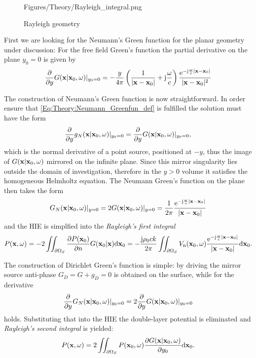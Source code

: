 \begin{figure}
	\centering
	\begin{overpic}[width = .5\columnwidth]{Figures/Theory/Rayleigh_integral.png}
	\end{overpic}
	\caption{Rayleigh geometry}
	\label{Fig:Theory:Rayleigh_geometry}
\end{figure}
\vspace{3mm}
First we are looking for the Neumann's Green function for the planar geometry under discussion:
For the free field Green's function the partial derivative on the plane $y_0 = 0$ is given by
\begin{equation}
\frac{\partial}{\partial y} G(\mathbf{x}|\mathbf{x}_0,\omega)|_{y_0 = 0} = 
- \frac{y}{4\pi}\left( \frac{1}{| \mathbf{x} - \mathbf{x}_0 |} + \mathrm{j} \frac{\omega}{c} \right) 
\frac{\mathrm{e}^{-\mathrm{j} \frac{\omega}{c}  | \mathbf{x} - \mathbf{x}_0 | }}{| \mathbf{x} - \mathbf{x}_0 |^2}
\end{equation}

The construction of Neumann's Green function is now straightforward. In order ensure that \eqref{Eq:Theory:Neumann_Greenfun_def} is fulfilled the solution must have the form
\begin{equation}
\frac{\partial}{\partial y} g_N(\mathbf{x}|\mathbf{x}_0,\omega)|_{y_0 = 0} = \frac{\partial}{\partial y} G(\mathbf{x}|\mathbf{x}_0,\omega)|_{y_0 = 0},
\end{equation}
which is the normal derivative of a point source, positioned at $-y$, thus the image of $G(\mathbf{x}|\mathbf{x}_0,\omega)$ mirrored on the infinite plane. Since this mirror singularity lies outside the domain of investigation, therefore in the $y > 0$ volume it satisfies the homogeneous Helmholtz equation. The Neumann Green's function on the plane then takes the form
\begin{equation}
G_N(\mathbf{x}|\mathbf{x}_0, \omega)|_{y = 0} = 
2G(\mathbf{x}|\mathbf{x}_0, \omega)|_{y = 0} = 
\frac{1}{2\pi} \frac{\mathrm{e}^{-\mathrm{j} \frac{\omega}{c} |\mathbf{x}-\mathbf{x}_0|}}{ |\mathbf{x}-\mathbf{x}_0| }
\end{equation}
and the HIE is simplfied into the \emph{Rayleigh's first integral}
\begin{multline}
P(\mathbf{x},\omega) =
- 2 \iint_{\partial \Omega_S} \frac{\partial P(\mathbf{x}_0)}{\partial n} G(\mathbf{x}_0|\mathbf{x}) \mathrm{d} \mathbf{x}_0 
=
 - \frac{\mathrm{j} \rho_0 c k}{2\pi} \iint_{\partial \Omega_S} V_{\mathrm{n}}(\mathbf{x}_0,\omega)   \frac{\mathrm{e}^{-\mathrm{j} \frac{\omega}{c} |\mathbf{x}-\mathbf{x}_0|}}{ |\mathbf{x}-\mathbf{x}_0| } \mathrm{d} \mathbf{x}_0.
\label{Eq:Theory:RayleighI}
\end{multline}

\vspace{3mm}
The construction of Dirichlet Green's function is simple: by driving the mirror source anti-phase $G_D = G + g_D = 0$ is obtained on the surface, while for the derivative
\begin{equation}
\frac{\partial}{\partial y} G_N(\mathbf{x}|\mathbf{x}_0,\omega)|_{y_0 = 0} = 2 \frac{\partial}{\partial y} G(\mathbf{x}|\mathbf{x}_0,\omega)|_{y_0 = 0}
\end{equation}
holds. Substituting that into the HIE the double-layer potential is eliminated and \emph{Rayleigh's second integral} is yielded:
\begin{equation}
P(\mathbf{x},\omega) = 
2 \iint_{\partial \Omega_S}  P(\mathbf{x}_0,\omega)  \frac{\partial G(\mathbf{x}|\mathbf{x}_0,\omega)}{\partial y_0}     \mathrm{d} \mathbf{x}_0.
\label{Eq:Theory:RayleighII}
\end{equation}

